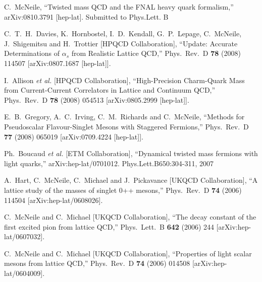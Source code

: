 \begin{thebibliography}{130}
  C.~McNeile,
  ``Twisted mass QCD and the FNAL heavy quark formalism,''
  arXiv:0810.3791 [hep-lat]. Submitted to Phys.Lett. B


  C.~T.~H.~Davies, K.~Hornbostel, I.~D.~Kendall, G.~P.~Lepage,
  C.~McNeile, J.~Shigemitsu and H.~Trottier
                  [HPQCD Collaboration],
  ``Update: Accurate Determinations of $\alpha_s$ from Realistic
  Lattice QCD,''
  Phys.\ Rev.\  D {\bf 78} (2008) 114507
  [arXiv:0807.1687 [hep-lat]].


  I.~Allison {\it et al.}  [HPQCD Collaboration],
  ``High-Precision Charm-Quark Mass from Current-Current Correlators
  in Lattice
  and Continuum QCD,''
  Phys.\ Rev.\  D {\bf 78} (2008) 054513
  [arXiv:0805.2999 [hep-lat]].


  E.~B.~Gregory, A.~C.~Irving, C.~M.~Richards and C.~McNeile,
  ``Methods for Pseudoscalar Flavour-Singlet Mesons with Staggered Fermions,''
Phys.\ Rev.\  D {\bf 77} (2008) 065019
  [arXiv:0709.4224 [hep-lat]].

  Ph.~Boucaud {\it et al.}  [ETM Collaboration],
  ``Dynamical twisted mass fermions with light quarks,''
  arXiv:hep-lat/0701012. Phys.Lett.B650:304-311, 2007

  A.~Hart, C.~McNeile, C.~Michael and J.~Pickavance  [UKQCD Collaboration],
  ``A lattice study of the masses of singlet 0++ mesons,''
  Phys.\ Rev.\ D {\bf 74} (2006) 114504
[arXiv:hep-lat/0608026].

  C.~McNeile and C.~Michael  [UKQCD Collaboration],
  ``The decay constant of the first excited pion from lattice QCD,''
  Phys.\ Lett.\ B {\bf 642} (2006) 244
  [arXiv:hep-lat/0607032].

  C.~McNeile and C.~Michael  [UKQCD Collaboration],
  ``Properties of light scalar mesons from lattice QCD,''
  Phys.\ Rev.\ D {\bf 74} (2006) 014508
  [arXiv:hep-lat/0604009].


\end{thebibliography}
